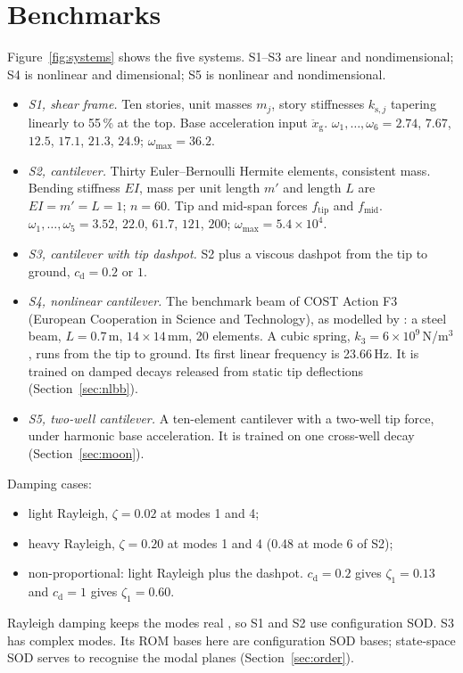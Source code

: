 \documentclass[preprint,12pt]{elsarticle}
\begin{document}
\section{Benchmarks}\label{sec:bench}
Figure~\ref{fig:systems} shows the five systems. S1--S3 are linear and nondimensional; S4 is nonlinear and dimensional; S5 is nonlinear and nondimensional.
\begin{itemize}
\item \emph{S1, shear frame.} Ten stories, unit masses $m_j$, story stiffnesses $k_{\mathrm s,j}$ tapering linearly to 55\,\% at the top. Base acceleration input $\ddot x_{\mathrm g}$. $\omega_1,\dots,\omega_6=2.74$, $7.67$, $12.5$, $17.1$, $21.3$, $24.9$; $\omega_{\max}=36.2$.
\item \emph{S2, cantilever.} Thirty Euler--Bernoulli Hermite elements, consistent mass. Bending stiffness $EI$, mass per unit length $m'$ and length $L$ are $EI=m'=L=1$; $n=60$. Tip and mid-span forces $f_{\mathrm{tip}}$ and $f_{\mathrm{mid}}$. $\omega_1,\dots,\omega_5=3.52$, $22.0$, $61.7$, $121$, $200$; $\omega_{\max}=5.4\times10^4$.
\item \emph{S3, cantilever with tip dashpot.} S2 plus a viscous dashpot from the tip to ground, $c_{\mathrm d}=0.2$ or $1$.
\item \emph{S4, nonlinear cantilever.} The benchmark beam of COST Action F3 (European Cooperation in Science and Technology), as modelled by \citet{Peeters2009}: a steel beam, $L=0.7$\,m, $14\times14$\,mm, 20 elements. A cubic spring, $k_3=6\times10^9$\,N/m$^3$, runs from the tip to ground. Its first linear frequency is 23.66\,Hz. It is trained on damped decays released from static tip deflections (Section~\ref{sec:nlbb}).
\item \emph{S5, two-well cantilever.} A ten-element cantilever with a two-well tip force, under harmonic base acceleration. It is trained on one cross-well decay (Section~\ref{sec:moon}).
\end{itemize}
Damping cases:
\begin{itemize}
\item light Rayleigh, $\zeta=0.02$ at modes 1 and 4;
\item heavy Rayleigh, $\zeta=0.20$ at modes 1 and 4 (0.48 at mode 6 of S2);
\item non-proportional: light Rayleigh plus the dashpot. $c_{\mathrm d}=0.2$ gives $\zeta_1=0.13$ and $c_{\mathrm d}=1$ gives $\zeta_1=0.60$.
\end{itemize}
Rayleigh damping keeps the modes real \citep{Caughey1965}, so S1 and S2 use configuration SOD. S3 has complex modes. Its ROM bases here are configuration SOD bases; state-space SOD serves to recognise the modal planes (Section~\ref{sec:order}).
\end{document}
